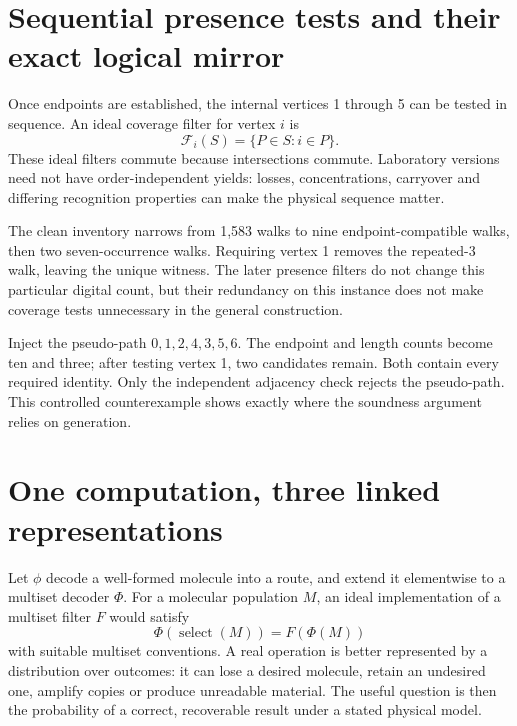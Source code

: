 \section{Sequential presence tests and their exact logical mirror}
Once endpoints are established, the internal vertices 1 through 5 can be tested in sequence. An ideal coverage filter for vertex $i$ is
\[
\mathcal F_i(S)=\{P\in S:i\in P\}.
\]
These ideal filters commute because intersections commute. Laboratory versions need not have order-independent yields: losses, concentrations, carryover and differing recognition properties can make the physical sequence matter.


The clean inventory narrows from 1,583 walks to nine endpoint-compatible walks, then two seven-occurrence walks. Requiring vertex 1 removes the repeated-3 walk, leaving the unique witness. The later presence filters do not change this particular digital count, but their redundancy on this instance does not make coverage tests unnecessary in the general construction.

Inject the pseudo-path $0,1,2,4,3,5,6$. The endpoint and length counts become ten and three; after testing vertex 1, two candidates remain. Both contain every required identity. Only the independent adjacency check rejects the pseudo-path. This controlled counterexample shows exactly where the soundness argument relies on generation.

\section{One computation, three linked representations}

Let $\phi$ decode a well-formed molecule into a route, and extend it elementwise to a multiset decoder $\Phi$. For a molecular population $M$, an ideal implementation of a multiset filter $F$ would satisfy
\[
\Phi(\operatorname{select}(M))=F(\Phi(M))
\]
with suitable multiset conventions. A real operation is better represented by a distribution over outcomes: it can lose a desired molecule, retain an undesired one, amplify copies or produce unreadable material. The useful question is then the probability of a correct, recoverable result under a stated physical model.

